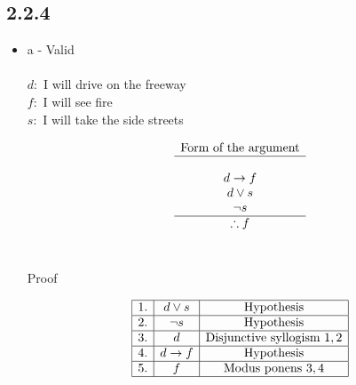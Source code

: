 \documentclass{article}
\begin{document}
\subsection*{2.2.4}
\begin{itemize}
    \item a - Valid \\
    \\
    $d:$ I will drive on the freeway \\
    $f:$ I will see fire \\
    $s:$ I will take the side streets
    
    $$
    \begin{array}{c}
        \text{Form of the argument} \\
        \hline \\
        d \rightarrow f \\
        d \lor s \\
        \neg s \\
        \hline
        \therefore f
    \end{array}
    $$
    \\

    \begin{center}
    Proof
    \end{center}
    $$
    \begin{array}{|c|c|c|}
        \hline
        1. & d \lor s & \text{Hypothesis} \\
        \hline
        2. & \neg s & \text{Hypothesis} \\
        \hline
        3. & d & \text{Disjunctive syllogism } 1,2 \\
        \hline
        4. & d \rightarrow f & \text{Hypothesis} \\
        \hline
        5. & f & \text{Modus ponens } 3,4 \\
        \hline
    \end{array}
    $$

\end{itemize}
\end{document}
